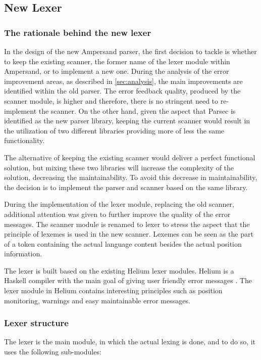 
\subsection{New Lexer}
\label{design:new-lexer}

\subsubsection{The rationale behind the new lexer}

In the design of the new Ampersand parser, the first decision to tackle is whether to keep the existing scanner, the former name of the lexer module within Ampersand, or to implement a new one.
During the analysis of the error improvement areas, as described in \autoref{sec:analysis}, the main improvements are identified within the old parser.
The error feedback quality, produced by the scanner module, is higher and therefore, there is no stringent need to re-implement the scanner.
On the other hand, given the aspect that Parsec is identified as the new parser library, keeping the current scanner would result in the utilization of two different libraries providing more of less the same functionality.

The alternative of keeping the existing scanner would deliver a perfect functional solution, but mixing these two libraries will increase the complexity of the solution, decreasing the maintainability.
To avoid this decrease in maintainability, the decision is to implement the parser and scanner based on the same library.

During the implementation of the lexer module, replacing the old scanner, additional attention was given to further improve the quality of the error messages.
The scanner module is renamed to lexer to stress the aspect that the principle of lexemes is used in the new scanner.
Lexemes can be seen as the part of a token containing the actual language content besides the actual position information.

The lexer is built based on the existing Helium lexer modules. 
Helium is a Haskell compiler with the main goal of giving user friendly error messages .
The lexer module in Helium contains interesting principles such as position monitoring, warnings and easy maintainable error messages.


\subsubsection{Lexer structure}
The lexer is the main module, in which the actual lexing is done, and to do so, it uses the following sub-modules:

